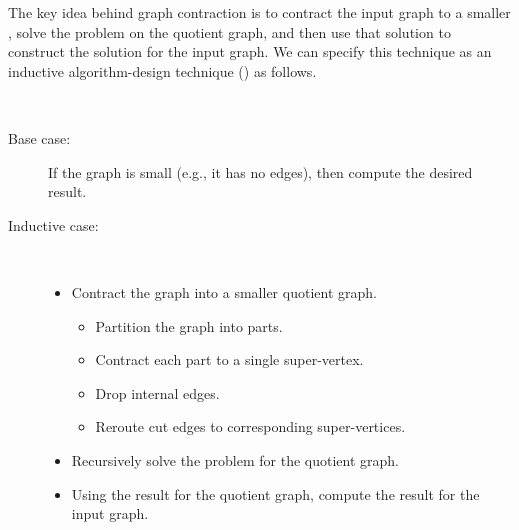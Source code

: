 {The key idea behind graph contraction is to contract the input graph
to a smaller , solve the problem on the quotient
graph, and then use that solution to construct the solution for the
input graph.  
%
We can specify this technique as an inductive algorithm-design
technique () as follows.


\begin{designtechnique}~
\label{dt:gc::gc-technique}
\begin{description}
\item[Base case:] If the graph is small (e.g., it has no edges), then compute
  the desired result.
\item[Inductive case:]~
\begin{itemize}
\item Contract the graph into a smaller quotient graph.
\begin{itemize}
\item Partition the graph into parts.
\item Contract each part to a single super-vertex.
\item Drop internal edges.
\item Reroute cut edges to corresponding super-vertices.  
\end{itemize}

\item Recursively solve the problem for the quotient graph.
\item Using the result for the quotient graph, compute the result
  for the input graph.
\end{itemize}
\end{description}
\end{designtechnique}





}
